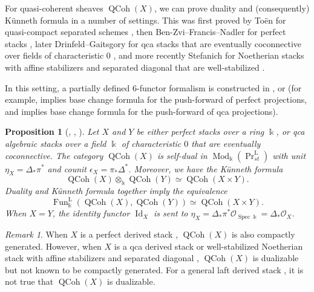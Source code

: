\documentclass[11pt]{amsart}
\numberwithin{equation}{section}
\theoremstyle{plain}
\newtheorem{Prop}[prop]{Proposition}
\theoremstyle{definition}
\theoremstyle{remark}
\newtheorem{RMK}[rmk]{Remark}
\newcommand{\cO} { {\mathcal{O}}}
\newcommand{\Id}{{\operatorname{Id}}}
\newcommand{\Mod}{{\operatorname{Mod}}}
\newcommand\Fun{\operatorname{Fun}}
\newcommand\PrLst{  {  \operatorname{Pr}^{\operatorname{L} }_{st} } }
\newcommand\QCoh{\operatorname{QCoh}}
\newcommand\Spec{\operatorname{Spec}}
\begin{document}
For quasi-coherent sheaves $\QCoh(X)$, we can prove duality and (consequently) K\"unneth formula in a number of settings. This was first proved by To\"en for quasi-compact separated schemes \cite[Section 8.3]{Toen_morita}, then Ben-Zvi--Francis--Nadler for perfect stacks \cite[Section 3]{Ben-Zvi-Francis-Nadler}, later Drinfeld--Gaitsgory for qca stacks that are eventually coconnective over fields of characteristic $0$ \cite[Section 4]{Drinfeld-Gaitsgory}, and more recently Stefanich for Noetherian stacks with affine stabilizers and separated diagonal that are well-stabilized \cite{stefanich2025dualizability_deriveds_stack}. 

In this setting, a partially defined 6-functor formalism is constructed in \cite[Section 3]{Ben-Zvi-Francis-Nadler}, \cite[Sections 1 \& 2]{Drinfeld-Gaitsgory} or \cite[Section 8.4]{Six-FunctorScholze} (for example, \cite[Proposition 3.10]{Ben-Zvi-Francis-Nadler} implies base change formula for the push-forward of perfect projections, and \cite[Corollary 1.4.5]{Drinfeld-Gaitsgory} implies base change formula for the push-forward of qca projections).

\begin{Prop}[{\cite[Corollary 1.8]{Toen_morita}, \cite[Theorem 1.2]{Ben-Zvi-Francis-Nadler}, \cite[Theorem 4.3.1]{Drinfeld-Gaitsgory}}]\label{prop:quasi-coh}
    Let $X$ and $Y$ be either perfect stacks over a ring $\Bbbk$, or qca algebraic stacks over a field $\Bbbk$ of characteristic $0$ that are eventually coconnective.
    The category $\QCoh(X)$ is self-dual in $\Mod_\Bbbk(\PrLst)$ with unit $\eta_X = \Delta_*\pi^*$ and counit $\epsilon_X = \pi_*\Delta^*$. Moreover, we have the K\"unneth formula
    \[\QCoh(X) \otimes_\Bbbk \QCoh(Y) \simeq \QCoh(X \times Y).\]
    Duality and K\"unneth formula together imply the equivalence
    \[\Fun^\mathrm{L}_\Bbbk(\QCoh(X), \QCoh(Y)) \simeq \QCoh(X \times Y).\]
    When $X = Y$, the identity functor $\Id_X$ is sent to $\eta_X = \Delta_*\pi^*\cO_{\Spec \Bbbk} = \Delta_*\cO_X$.
\end{Prop}

\begin{RMK}
    When $X$ is a perfect derived stack \cite{Ben-Zvi-Francis-Nadler}, $\QCoh(X)$ is also compactly generated. However, when $X$ is a qca derived stack \cite{Drinfeld-Gaitsgory} or well-stabilized Noetherian stack with affine stabilizers and separated diagonal \cite{stefanich2025dualizability_deriveds_stack}, $\QCoh(X)$ is dualizable but not known to be compactly generated. For a general laft derived stack \cite{Gaitsgory-Rozenblyum}, it is not true that $\QCoh(X)$ is dualizable.
\end{RMK}
\end{document}
